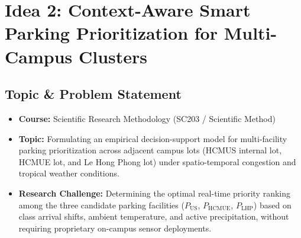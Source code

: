 \documentclass[11pt,a4paper]{article}
\begin{document}
\newpage

\section{Idea 2: Context-Aware Smart Parking Prioritization for Multi-Campus Clusters}

\subsection{Topic \& Problem Statement}
\begin{itemize}[leftmargin=1.5em]
    \item \textbf{Course:} Scientific Research Methodology (SC203 / Scientific Method)
    \item \textbf{Topic:} Formulating an empirical decision-support model for multi-facility parking prioritization across adjacent campus lots (HCMUS internal lot, HCMUE lot, and Le Hong Phong lot) under spatio-temporal congestion and tropical weather conditions.
    \item \textbf{Research Challenge:} Determining the optimal real-time priority ranking among the three candidate parking facilities ($P_{\text{US}}$, $P_{\text{HCMUE}}$, $P_{\text{LHP}}$) based on class arrival shifts, ambient temperature, and active precipitation, without requiring proprietary on-campus sensor deployments.
\end{itemize}
\end{document}
